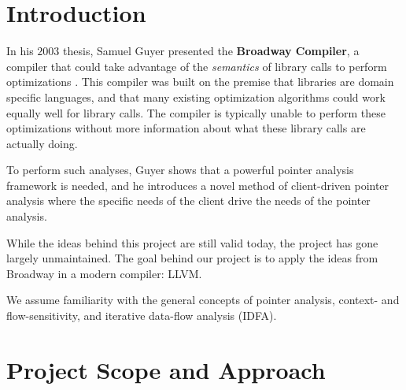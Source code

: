  

\newcommand{\HRule}{\rule{\linewidth}{0.5mm}}

\everymath{\displaystyle} \newcommand{\code}[1]{\texttt{#1}}


 



\tableofcontents
\listoffigures
\newpage


\section{Introduction}

In his $2003$ thesis, Samuel Guyer presented the {\bf Broadway Compiler}, a
compiler that could take advantage of the {\em semantics} of library calls to
perform optimizations \cite{guyer}. This compiler was built on the premise that
libraries are domain specific languages, and that many existing optimization
algorithms could work equally well for library calls. The compiler is typically
unable to perform these optimizations without more information about what these
library calls are actually doing.

To perform such analyses, Guyer shows that a powerful pointer analysis framework
is needed, and he introduces a novel method of client-driven pointer analysis
where the specific needs of the client drive the needs of the pointer
analysis.

While the ideas behind this project are still valid today, the project has gone
largely unmaintained. The goal behind our project is to apply the ideas from
Broadway in a modern compiler: LLVM.

We assume familiarity with the general concepts of pointer analysis, context-
and flow-sensitivity, and iterative data-flow analysis (IDFA).


\section{Project Scope and Approach}

